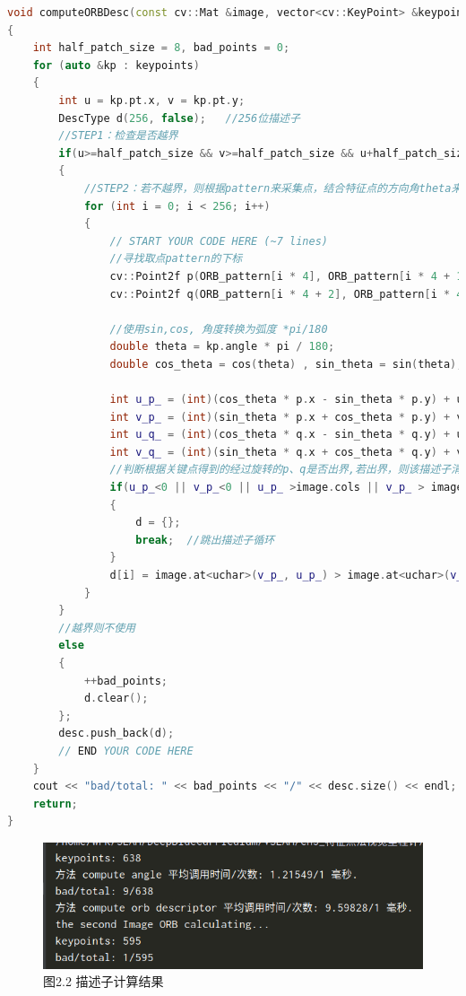 \documentclass[40pt,a4paper，UTF8]{ctexart}
\numberwithin{equation}{section}
\begin{document}
\begin{lstlisting}[language=C++, caption=computeORB.cpp]
void computeORBDesc(const cv::Mat &image, vector<cv::KeyPoint> &keypoints, vector<DescType> &desc)
{
    int half_patch_size = 8, bad_points = 0;
    for (auto &kp : keypoints)
    {
        int u = kp.pt.x, v = kp.pt.y;
        DescType d(256, false);   //256位描述子
        //STEP1：检查是否越界
        if(u>=half_patch_size && v>=half_patch_size && u+half_patch_size<=image.cols && v+half_patch_size<=image.rows)
        {
            //STEP2：若不越界，则根据pattern来采集点，结合特征点的方向角theta来旋转点p，q->p',q'，计算p',q'的坐标，并比较大小，结果作为该位描述子的结果(0 or 1)
            for (int i = 0; i < 256; i++)
            {
                // START YOUR CODE HERE (~7 lines)
                //寻找取点pattern的下标
                cv::Point2f p(ORB_pattern[i * 4], ORB_pattern[i * 4 + 1]);
                cv::Point2f q(ORB_pattern[i * 4 + 2], ORB_pattern[i * 4 + 3]);

                //使用sin,cos, 角度转换为弧度 *pi/180
                double theta = kp.angle * pi / 180;
                double cos_theta = cos(theta) , sin_theta = sin(theta);

                int u_p_ = (int)(cos_theta * p.x - sin_theta * p.y) + u;
                int v_p_ = (int)(sin_theta * p.x + cos_theta * p.y) + v;
                int u_q_ = (int)(cos_theta * q.x - sin_theta * q.y) + u;
                int v_q_ = (int)(sin_theta * q.x + cos_theta * q.y) + v;
                //判断根据关键点得到的经过旋转的p、q是否出界,若出界，则该描述子清空作废
                if(u_p_<0 || v_p_<0 || u_p_ >image.cols || v_p_ > image.rows || u_q_<0 || v_q_<0 || u_q_ >image.cols || v_q_ > image.rows)
                {
                    d = {};
                    break;  //跳出描述子循环
                }
                d[i] = image.at<uchar>(v_p_, u_p_) > image.at<uchar>(v_q_, u_q_) ? false : true;  //前者大取false，后者大取true，vector随机访问器，不够快，但是掌握算法是关键
            }
        }
        //越界则不使用
        else
        {
            ++bad_points;
            d.clear();
        };
        desc.push_back(d);
        // END YOUR CODE HERE
    }
    cout << "bad/total: " << bad_points << "/" << desc.size() << endl;
    return;
}
\end{lstlisting}

\begin{figure}[H]
\centering
\includegraphics[width=4.8in]{ch5_2_2.png} {图2.2 描述子计算结果}
\end{figure}
\end{document}
